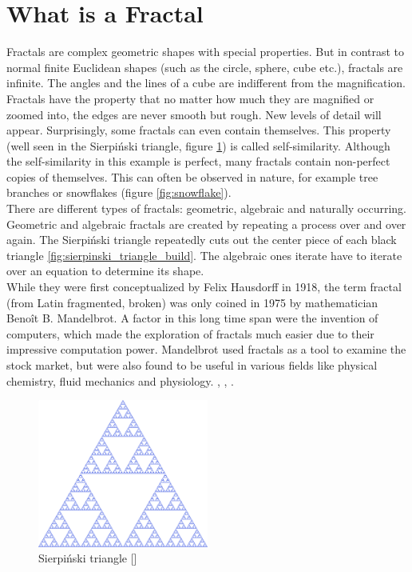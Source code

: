 \documentclass[10pt,a4paper,titlepage]{article}
\begin{document}
	\section{What is a Fractal}
	Fractals are complex geometric shapes with special properties. But in contrast to normal finite Euclidean shapes (such as the circle, sphere, cube etc.), fractals are infinite. The angles and the lines of a cube are indifferent from the magnification. Fractals have the property that no matter how much they are magnified or zoomed into, the edges are never smooth but rough. New levels of detail will appear. Surprisingly, some fractals can even contain themselves. This property (well seen in the Sierpiński triangle, figure \ref{fig:sierpinski_triangle}) is called self-similarity. Although the self-similarity in this example is perfect, many fractals contain non-perfect copies of themselves. This can often be observed in nature, for example tree branches or snowflakes (figure \ref{fig:snowflake}).\\
	There are different types of fractals: geometric, algebraic and naturally occurring. Geometric and algebraic fractals are created by repeating a process over and over again. The Sierpiński triangle repeatedly cuts out the center piece of each black triangle \ref{fig:sierpinski_triangle_build}. The algebraic ones iterate have to iterate over an equation to determine its shape.\\
	While they were first conceptualized by Felix Hausdorff in 1918, the term fractal (from Latin fragmented, broken) was only coined in 1975 by mathematician Benoît B. Mandelbrot. A factor in this long time span were the invention of computers, which made the exploration of fractals much easier due to their impressive computation power. Mandelbrot used fractals as a tool to examine the stock market, but were also found to be useful in various fields like physical chemistry, fluid mechanics and physiology. \cite{FractalFoundation}, \cite{FractalFoundation}, \cite{britannica}.
	\begin{figure}[h]
		\caption{Sierpiński triangle [\cite{Sierpinski}]}
		\label{fig:sierpinski_triangle}
		\centering
		\includegraphics[width=0.5\textwidth]{"res/images/1000px-Sierpinski_triangle.svg.png"}
	\end{figure}
\end{document}
